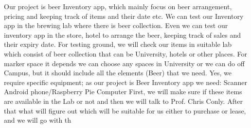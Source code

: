 Our project is beer Inventory app, which mainly focus on beer arrangement, pricing and keeping track of items and their date etc.  We can test our Inventory app in the brewing lab where there is beer collection. Even we can test our inventory app in the store, hotel to arrange the beer, keeping track of sales and their expiry date. For testing ground, we will check our items in suitable lab which consist of beer collection that can be University, hotels or other places. For marker space it depends we can choose any spaces in University or we can do off Campus, but it should include all the elements (Beer) that we need. Yes, we require specific equipment; as our project is Beer Inventory app we need:
 Scanner
Android phone/Raspberry Pie
 Computer 
First, we will make sure if these items are available in the Lab or not and then we will talk to Prof. Chris Conly. After that what will figure out which will be suitable for us either to purchase or lease, and  we will go with th
